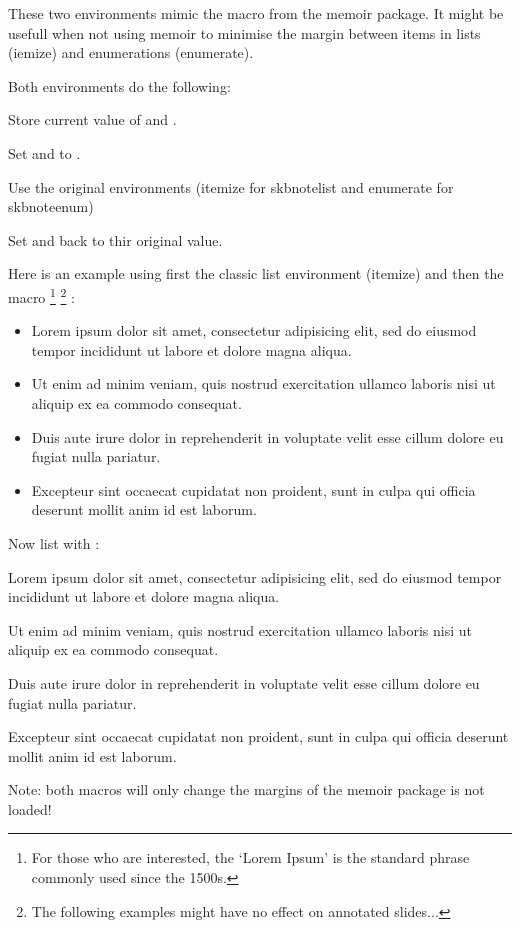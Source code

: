 
\DescribeMacro{\skbnotelist}
\DescribeMacro{\skbnoteenum}
These two environments mimic the macro \cmd{\tightlists} from the memoir package. It might be 
usefull when not using memoir to minimise the margin between items in lists (iemize) and enumerations
(enumerate).

Both environments do the following:
\begin{skbnotelist}
  \item Store current value of \cmd{\parskip} and \cmd{\itemsep}.
  \item Set \cmd{\parskip} and \cmd{\itemsep} to \skbem[code]{0cm}.
  \item Use the original environments (itemize for skbnotelist and enumerate for skbnoteenum)
  \item Set \cmd{\parskip} and \cmd{\itemsep} back to thir original value.
\end{skbnotelist}

Here is an example using first the classic list environment (itemize) and then the  macro
\cmd{\skbnotelist}
\footnote{For those who are interested, the `Lorem Ipsum' is the standard phrase commonly used since the 1500s.}
\footnote{The following examples might have no effect on annotated slides...}
:
\setlength{\parskip}{4.5pt}
\setlength{\itemsep}{4.5pt}
\begin{itemize}
  \item Lorem ipsum dolor sit amet, consectetur adipisicing elit, sed do eiusmod tempor incididunt ut labore et dolore magna aliqua.
  \item Ut enim ad minim veniam, quis nostrud exercitation ullamco laboris nisi ut aliquip ex ea commodo consequat.
  \item Duis aute irure dolor in reprehenderit in voluptate velit esse cillum dolore eu fugiat nulla pariatur.
  \item Excepteur sint occaecat cupidatat non proident, sunt in culpa qui officia deserunt mollit anim id est laborum.
\end{itemize}

\noindent Now list with \cmd{\skbnotelist}:
\begin{skbnotelist}
  \item Lorem ipsum dolor sit amet, consectetur adipisicing elit, sed do eiusmod tempor incididunt ut labore et dolore magna aliqua.
  \item Ut enim ad minim veniam, quis nostrud exercitation ullamco laboris nisi ut aliquip ex ea commodo consequat.
  \item Duis aute irure dolor in reprehenderit in voluptate velit esse cillum dolore eu fugiat nulla pariatur.
  \item Excepteur sint occaecat cupidatat non proident, sunt in culpa qui officia deserunt mollit anim id est laborum.
\end{skbnotelist}

Note: both macros will only change the margins of the memoir package is not loaded!